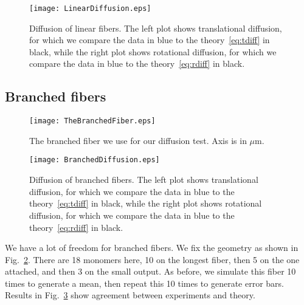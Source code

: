 \documentclass[11pt]{article}
\begin{document}
\begin{figure}
\centering
\texttt{[image: LinearDiffusion.eps]}
\caption{\label{fig:LinearDiff}Diffusion of linear fibers. The left plot shows translational diffusion, for which we compare the data in blue to the theory\ \eqref{eq:tdiff} in black, while the right plot shows rotational diffusion, for which we compare the data in blue to the theory\ \eqref{eq:rdiff} in black.}
\end{figure}


\subsection{Branched fibers}
\begin{figure}
\centering
\texttt{[image: TheBranchedFiber.eps]}
\caption{\label{fig:BranchFib}The branched fiber we use for our diffusion test. Axis is in $\mu$m.}
\end{figure}


\begin{figure}
\centering
\texttt{[image: BranchedDiffusion.eps]}
\caption{\label{fig:BranchedDiff}Diffusion of branched fibers.  The left plot shows translational diffusion, for which we compare the data in blue to the theory\ \eqref{eq:tdiff} in black, while the right plot shows rotational diffusion, for which we compare the data in blue to the theory\ \eqref{eq:rdiff} in black.}
\end{figure}

We have a lot of freedom for branched fibers. We fix the geometry as shown in Fig.\ \ref{fig:BranchFib}. There are 18 monomers here, 10 on the longest fiber, then 5 on the one attached, and then 3 on the small output. As before, we simulate this fiber 10 times to generate a mean, then repeat this 10 times to generate error bars. Results in Fig.\ \ref{fig:BranchedDiff} show agreement between experiments and theory.
\end{document}
